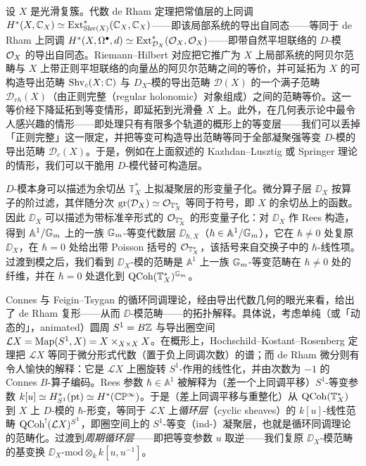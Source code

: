 设 $X$ 是光滑复簇。代数 de Rham 定理把常值层的上同调 $H^*(X,\mathbb{C}_X)\simeq\operatorname{Ext}^*_{\operatorname{Shv}(X)}(\mathbb{C}_X,\mathbb{C}_X)$——即该局部系统的导出自同态——等同于 de Rham 上同调 $H^*(X,\Omega^\bullet,d)\simeq\operatorname{Ext}^*_{\mathcal{D}_X}(\mathcal{O}_X,\mathcal{O}_X)$——即带自然平坦联络的 $D$-模 $\mathcal{O}_X$ 的导出自同态。Riemann--Hilbert 对应把它推广为 $X$ 上局部系统的阿贝尔范畴与 $X$ 上带正则平坦联络的向量丛的阿贝尔范畴之间的等价，并可延拓为 $X$ 的可构造导出范畴 $\operatorname{Shv}_c(X;\mathbb{C})$ 与 $D_X$-模的导出范畴 $\mathcal D(X)$ 的一个满子范畴 $\mathcal D_{rh}(X)$（由正则完整（regular holonomic）对象组成）之间的范畴等价。这一等价经下降延拓到等变情形，即延拓到光滑叠 $X$ 上。此外，在几何表示论中最令人感兴趣的情形——即处理只有有限多个轨道的概形上的等变层——我们可以丢掉「正则完整」这一限定，并把等变可构造导出范畴等同于全部凝聚强等变 $D$-模的导出范畴 $\mathcal D_c(X)$。于是，例如在上面叙述的 Kazhdan--Lusztig 或 Springer 理论的情形，我们可以干脆用 $D$-模代替可构造层。

$D$-模本身可以描述为余切丛 $\mathbb T^*_X$ 上拟凝聚层的形变量子化。微分算子层 $\DD_X$ 按算子的阶过滤，其伴随分次 $\operatorname{gr}(\mathcal{D}_X)\simeq\mathcal{O}_{\mathbb T^*_X}$ 等同于符号，即 $X$ 的余切丛上的函数。因此 $\DD_X$ 可以描述为带标准辛形式的 $\mathcal{O}_{\mathbb T^*_X}$ 的形变量子化：对 $\DD_X$ 作 Rees 构造，得到 $\mathbb A^1/\mathbb{G}_m$ 上的一族 $\mathbb{G}_m$-等变代数层 $\DD_{\hbar,X}$（$\hbar\in\mathbb A^1/\mathbb{G}_m$），它在 $\hbar\neq0$ 处复原 $\DD_X$，在 $\hbar=0$ 处给出带 Poisson 括号的 $\mathcal{O}_{\mathbb T^*_X}$，该括号来自交换子中的 $\hbar$-线性项。过渡到模之后，我们看到 $\DD_X$-模的范畴是 $\mathbb A^1$ 上一族 $\mathbb{G}_m$-等变范畴在 $\hbar\neq0$ 处的纤维，并在 $\hbar=0$ 处退化到 $\operatorname{QCoh}(\mathbb T^*_X)^{\mathbb{G}_m}$。

Connes 与 Feigin--Tsygan 的循环同调理论，经由导出代数几何的眼光来看，给出了 de Rham 复形——从而 $\DD$-模范畴——的拓扑解释。具体说，考虑单纯（或「动态的」，animated）圆周 $S^1=B\mathbb{Z}$ 与导出圈空间 $\mathcal L X=\operatorname{Map}(S^1,X)=X\times_{X\times X}X$。在概形上，Hochschild--Kostant--Rosenberg 定理把 $\mathcal L X$ 等同于微分形式代数（置于负上同调次数）的谱；而 de Rham 微分则有令人愉快的解释：它是 $\mathcal L X$ 上圈旋转 $S^1$-作用的线性化，并由次数为 $-1$ 的 Connes $B$-算子编码。Rees 参数 $\hbar\in\mathbb A^1$ 被解释为（差一个上同调平移）$S^1$-等变参数 $k[u]\simeq H^*_{S^1}(\mathrm{pt})\simeq H^*(\mathbb{C}\mathbb{P}^\infty)$。于是（差上同调平移与重整化）从 $\operatorname{QCoh}(\mathbb T^*_X)$ 到 $X$ 上 $D$-模的 $\hbar$-形变，等同于 $\mathcal L X$ 上\emph{循环层}（cyclic sheaves）的 $k[u]$-线性范畴 $\operatorname{QCoh}^!(\mathcal L X)^{S^1}$，即圈空间上的 $S^1$-等变（ind-）凝聚层，也就是循环同调理论的范畴化。过渡到\emph{周期循环层}——即把等变参数 $u$ 取逆——我们复原 $\DD_X$-模范畴的基变换 $\DD_X\text{-mod}\otimes_k k[u,u^{-1}]$。

